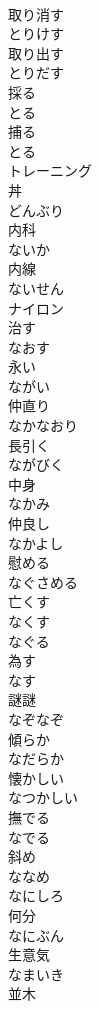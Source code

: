 \documentclass[8pt]{extreport}
\begin{document}
\begin{CJK}{UTF8}{min}
\\	取り消す 
\\	とりけす	
\\	取り出す 
\\	とりだす	
\\	採る 
\\	とる	
\\	捕る 
\\	とる	
\\	トレーニング	
\\	丼 
\\	どんぶり	
\\	内科 
\\	ないか	
\\	内線 
\\	ないせん	
\\	ナイロン	
\\	治す 
\\	なおす	
\\	永い 
\\	ながい	
\\	仲直り 
\\	なかなおり	
\\	長引く 
\\	ながびく	
\\	中身 
\\	なかみ	
\\	仲良し 
\\	なかよし	
\\	慰める 
\\	なぐさめる	
\\	亡くす 
\\	なくす	
\\	なぐる	
\\	為す 
\\	なす	
\\	謎謎 
\\	なぞなぞ	
\\	傾らか 
\\	なだらか	
\\	懐かしい 
\\	なつかしい	
\\	撫でる 
\\	なでる	
\\	斜め 
\\	ななめ	
\\	なにしろ	
\\	何分 
\\	なにぶん	
\\	生意気 
\\	なまいき	
\\	並木 

\end{CJK}
\end{document}
